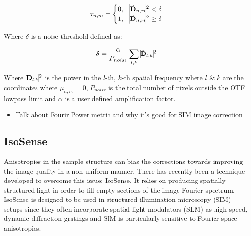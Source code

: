 	\begin{equation}\label{eq:noise_threshold_mask}
	\tau_{n,m} = 
	\begin{cases}
	0, & \vline \tilde{\textbf{D}}_{n,m} \vline^2 < \delta\\
	1, & \vline \tilde{\textbf{D}}_{n,m} \vline^2 \ge \delta\\ 
	\end{cases}
	\end{equation}
	
	Where $\delta$ is a noise threshold defined as:
		
	\begin{equation}\label{eq:noise_threshold}
	\delta = \frac{\alpha}{P_{noise}}\sum\limits_{l,k}{\vline \tilde{\textbf{D}}_{l,k} \vline^2}
	\end{equation}
	
	Where $\vline \tilde{\textbf{D}}_{l,k} \vline^2$ is the power in the 
	$l$-th, $k$-th spatial frequency where $l$ \& $k$ are the coordinates 
	where $\mu_{n,m} = 0$, $P_{noise}$ is the total number of pixels 
	outside the OTF lowpass limit and $\alpha$ is a user defined 
	amplification factor. 
	
	\begin{itemize}
		\item Talk about Fourir Power metric and why it's good for SIM image correction
	\end{itemize}

	\subsection{IsoSense}
	\label{subsec:isosense}
	
	Anisotropies in the sample structure can bias the corrections
	towards improving the image quality in a non-uniform manner.
	There has recently been a technique developed to overcome 
	this issue; IsoSense\cite{vzurauskas2019isosense}. It relies 
	on producing spatially structured light in order to fill 
	empty sections of the image Fourier spectrum. IsoSense is 
	designed to be used in structured illumination microscopy 
	(SIM) setups since they often incorporate spatial light 
	modulators (SLM) as high-speed, dynamic diffraction 
	gratings and SIM is particularly sensitive to Fourier
	space anisotropies.
	
